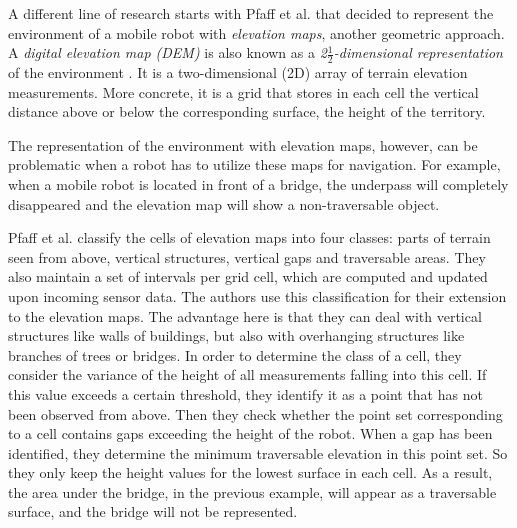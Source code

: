\documentclass[12pt,a4paper]{report}
\newcommand{\etal}[1]{#1 et al.}
\newcommand{\term}{\textit}
\newcommand{\acronym}{\MakeUppercase}
\newcommand{\itfrac}[2]{\frac{\textit{#1}}{\textit{#2}}}
\begin{document}
	A different line of research starts with \etal{Pfaff} that decided to represent 
	the environment of a mobile robot with \term{elevation maps}, another geometric 
	approach. A \term{digital elevation map (\acronym{dem})} \cite{Kweon} is also known as a
	\term{2\(\itfrac{1}{2}\)-dimensional representation} of the environment 
	\cite{Pfaff}. It is a two-dimensional (\acronym{2d}) array of terrain elevation 
	measurements. More concrete, it is a grid that stores in each cell the vertical 
	distance above or below the corresponding surface, the height of the territory. 
	\par 
	The representation of the environment with elevation maps, however, can 
	be problematic when a robot has to utilize these maps for navigation. For 
	example, when a mobile robot is located in front of a bridge, the underpass will 
	completely disappeared and the elevation map will show a non-traversable 
	object.
	\par
	\etal{Pfaff} \cite{Pfaff} classify the cells of elevation maps into four classes: 
	parts of terrain seen from above, vertical structures, vertical gaps and 
	traversable areas. They also maintain a set of intervals per grid cell, which 
	are computed and updated upon incoming sensor data. The authors use this 
	classification for their extension to the elevation maps. The advantage here is 
	that they can deal with vertical structures like walls of buildings, but also 
	with overhanging structures like branches of trees or bridges. In order to 
	determine the class of a cell, they consider the variance of the height of all 
	measurements falling into this cell. If this value exceeds a certain threshold, 
	they identify it as a point that has not been observed from above. Then they 
	check whether the point set corresponding to a cell	contains gaps exceeding the 
	height of the robot. When a gap has been identified, they determine the	minimum 
	traversable elevation in this point set. So they only keep the height values for 
	the lowest surface in each cell. As a result, the area under the bridge, in the 
	previous example, will appear as a traversable surface, and the bridge will not 
	be represented.
	\\
	
\end{document}
